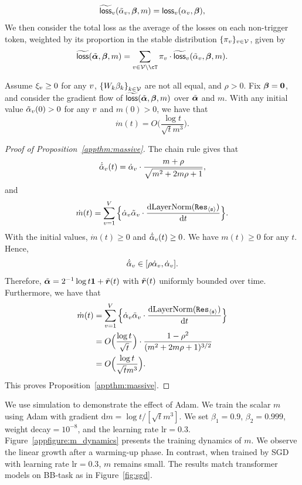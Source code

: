 \[
\widetilde{\mathsf{loss}}_v(\Tilde{\alpha}_v, \boldsymbol{\beta}, m) = \mathsf{loss}_v(\alpha_v, \boldsymbol{\beta}),
\]
We then consider the total loss as the average of the losses on each non-trigger token, weighted by its proportion in the stable distribution $\{\pi_v\}_{v \in \mathcal{V}}$, given by
\begin{equation}\label{appeqn:res_total_loss}
\wt{\loss}(\Tilde{\vecsink}, \vecvalue, m) = \sum_{\tok \in \vocab \setminus \cT} \stable_\tok \cdot \wt{\loss}_\tok(\Tilde{\sink}_\tok, \vecvalue, m).
\end{equation}
\begin{proposition}\label{appthm:massive}
Assume $\xi_v\geq 0$ for any $v$, ${\left\{ W_k\beta_k \right\}}_{k\in\mathcal{V}}$ are not all equal, and $\rho>0$. Fix $\boldsymbol{\beta}=\bm{0}$, and consider the gradient flow of $\widetilde{\mathsf{loss}}(\Tilde{\bm{\alpha}}, \boldsymbol{\beta}, m)$ over $\Tilde{\bm{\alpha}}$ and $m$. With any initial value $\Tilde{\alpha}_v(0)>0$ for any $v$ and $m(0)>0$, we have that
\[
\dot{m}(t)=O\Big(\frac{\log t}{\sqrt{t} m^{3}}\Big).
\]
\end{proposition}
\begin{proof}[Proof of Proposition~\ref{appthm:massive}]
The chain rule gives that
\[
\dot{\Tilde{\alpha}}_v(t) = \dot{\alpha}_v \cdot \frac{m+\rho}{\sqrt{m^2+2m\rho+1}},
\]
and
\[
\dot{m}(t) = \sum_{v=1}^V \Big\{\dot{\alpha}_v \Tilde{\alpha}_v \cdot \frac{\mathrm{d} \text{LayerNorm}({\tt Res}_{\texttt{$\langle \texttt{s}\rangle$}})}{\mathrm{d} t} \Big\}.
\]
With the initial values, $\dot{m}(t)\geq 0$ and $\dot{\Tilde{\alpha}}_v(t) \geq 0$.
We have $m(t)\geq 0$ for any $t$. Hence, $$\dot{\Tilde{\alpha}}_v \in [\rho \dot{\alpha}_v,  \dot{\alpha}_v].$$ 
Therefore, $\Tilde{\bm{\alpha}} = 2^{-1} \log t \bm{1} + \Tilde{\bm{r}}(t)$ with $\Tilde{\bm{r}}(t)$ uniformly bounded over time. Furthermore, we have that
\begin{align*}
\dot{m}(t) & = \sum_{v=1}^V \Big\{\dot{\alpha}_v \Tilde{\alpha}_v \cdot \frac{\mathrm{d} \text{LayerNorm}({\tt Res}_{\texttt{$\langle \texttt{s}\rangle$}})}{\mathrm{d} t} \Big\}\\
& = O\Big(\frac{\log t}{\sqrt{t}}\Big) \cdot \frac{1-\rho^2}{(m^2+2m\rho+1)^{3/2}}\\
& = O\Big(\frac{\log t}{\sqrt{t}m^3}\Big).
\end{align*}
This proves Proposition~\ref{appthm:massive}.
\end{proof}
We use simulation to demonstrate the effect of Adam. We train the scalar $m$ using Adam with gradient $\mathrm{d}m = \log t / [\sqrt{t}m^3]$. We set $\beta_1=0.9$, $\beta_2=0.999$, weight decay$=10^{-8}$, and the learning rate $\text{lr}=0.3$. Figure~\ref{appfigure:m_dynamics} presents the training dynamics of $m$. We observe the linear growth after a warming-up phase. In contrast, when trained by SGD with learning rate $\text{lr}=0.3$, $m$ remains small. The results match transformer models on BB-task as in Figure~\ref{fig:sgd}.

